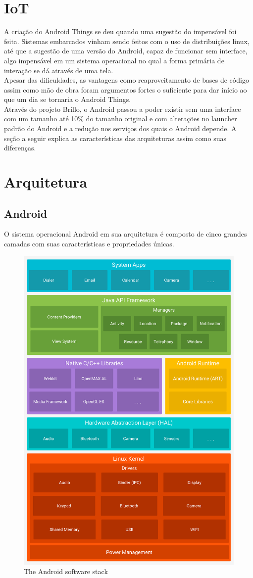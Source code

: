 \documentclass[12pt]{article}
\begin{document}
\section{IoT}
A criação do Android Things se deu quando uma sugestão do impensável foi feita. Sistemas embarcados vinham sendo feitos com o uso de distribuições linux, até que a sugestão de uma versão do Android, capaz de funcionar sem interface, algo impensável em um sistema operacional no qual a forma primária de interação se dá através de uma tela.
\\Apesar das dificuldades, as vantagens como reaproveitamento de bases de código assim como mão de obra foram argumentos fortes o suficiente para dar início ao que um dia se tornaria o Android Things.
\\Através do projeto Brillo, o Android passou a poder existir sem uma interface com um tamanho até 10\% do tamanho original e com alterações no launcher padrão do Android e a redução nos serviços dos quais o Android depende. A seção a seguir explica as características das arquiteturas assim como suas diferenças.

\section{Arquitetura} \label{sec:firstpage}
\subsection{Android}
O sistema operacional Android em sua arquitetura é composto de cinco grandes camadas com suas características e propriedades únicas. 
\begin{figure}[ht]
\centering
\includegraphics[width=.6\textwidth]{images/android-stack_2x.png}
\caption{The Android software stack}
\label{fig:androidstack}
\end{figure}
\end{document}
